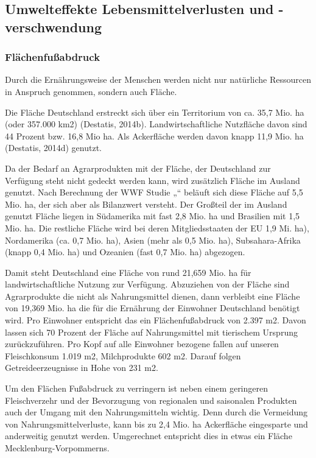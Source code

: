 \subsection{Umwelteffekte Lebensmittelverlusten und
-verschwendung}
\subsubsection{Flächenfußabdruck}
Durch die Ernährungsweise der Menschen werden nicht nur natürliche Ressourcen in Anspruch genommen, sondern auch Fläche.

Die Fläche Deutschland erstreckt sich über ein Territorium von ca. 35,7 Mio. ha (oder 357.000 km2) (Destatis, 2014b). Landwirtschaftliche Nutzfläche davon sind 44 Prozent bzw. 16,8 Mio ha. Als Ackerfläche werden davon knapp 11,9 Mio. ha (Destatis, 2014d) genutzt. %

Da der Bedarf an Agrarprodukten mit der Fläche, der Deutschland zur Verfügung steht nicht gedeckt werden kann, wird zusätzlich Fläche im Ausland genutzt. Nach Berechnung der WWF Studie „“ beläuft sich diese Fläche auf 5,5 Mio. ha, der sich aber als Bilanzwert versteht. Der Großteil der im Ausland genutzt Fläche liegen in Südamerika mit fast 2,8 Mio. ha und Brasilien mit 1,5 Mio. ha. Die restliche Fläche wird bei deren Mitgliedsstaaten der EU 1,9 Mi. ha), Nordamerika (ca. 0,7 Mio. ha), Asien (mehr als 0,5 Mio. ha), Subsahara-Afrika (knapp 0,4 Mio. ha) und Ozeanien (fast 0,7 Mio. ha) abgezogen. %


Damit steht Deutschland eine Fläche von rund 21,659 Mio. ha für landwirtschaftliche Nutzung zur Verfügung. Abzuziehen von der Fläche sind Agrarprodukte die nicht als Nahrungsmittel dienen, dann verbleibt eine Fläche von 19,369 Mio. ha die für die Ernährung der Einwohner Deutschland benötigt wird. Pro Einwohner entspricht das ein Flächenfußabdruck von 2.397 m2. Davon lassen sich 70 Prozent der Fläche auf Nahrungsmittel mit tierischem Ursprung zurückzuführen. Pro Kopf auf alle Einwohner bezogene fallen auf unseren Fleischkonsum 1.019 m2, Milchprodukte 602 m2. Darauf folgen Getreideerzeugnisse in Hohe von 231 m2. %

Um den Flächen Fußabdruck zu verringern ist neben einem geringeren Fleischverzehr und der Bevorzugung von regionalen und saisonalen Produkten auch der Umgang mit den Nahrungsmitteln wichtig. Denn durch die Vermeidung von Nahrungsmittelverluste, kann bis zu 2,4 Mio. ha Ackerfläche eingesparte und anderweitig genutzt werden. Umgerechnet entspricht dies in etwas ein Fläche Mecklenburg-Vorpommerns. %

